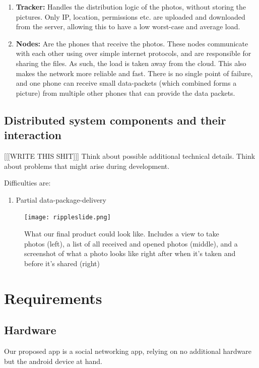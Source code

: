 \documentclass{report}
\newcommand{\lfig}[1]{\label{fig:#1}}
\begin{document}
\begin{enumerate}
\item \textbf{Tracker:} Handles the distribution logic of the photos, without storing  the pictures. 
Only IP, location, permissions etc. are uploaded and downloaded from the server, allowing this to have a low worst-case and average load. 
\item \textbf{Nodes:} Are the phones that receive the photos. 
These nodes communicate with each other using over simple internet protocols, and are responsible for sharing the files. As such, the load is taken away from the cloud. 
This also makes the network more reliable and fast. There is no single point of failure, and one phone can receive small data-packets (which combined forms a picture) from multiple other phones that can provide the data packets.
\end{enumerate}

\subsection{Distributed system components and their interaction}
[[[WRITE THIS SHIT]]]
Think about possible additional technical details.
Think about problems that might arise during development.

Difficulties are:
\begin{enumerate}
\item Partial data-package-delivery
\end{enumerate}

\begin{figure}[h]
	\centering
    \texttt{[image: rippleslide.png]}
    \lfig{example}
    \vspace{-5mm} %
	\caption{What our final product could look like. Includes a view to take photos (left), a list of all received and opened photos (middle), and a screenshot of what a photo looks like right after when it's taken and before it's shared (right)}
\end{figure}



\section{Requirements}

\subsection{Hardware}
Our proposed app is a social networking app, relying on no additional hardware but the android device at hand.
\end{document}
